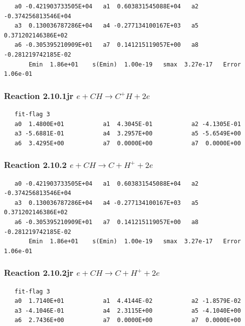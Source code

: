 \documentclass[12pt,dvipdfmx]{article}
\begin{document}
\begin{small}\begin{verbatim}
   a0 -0.421903733505E+04   a1  0.603831545088E+04   a2 -0.374256813546E+04
   a3  0.130036787286E+04   a4 -0.277134100167E+03   a5  0.371202146386E+02
   a6 -0.305395210909E+01   a7  0.141215119057E+00   a8 -0.281219742185E-02
       Emin  1.86e+01    s(Emin)  1.00e-19   smax  3.27e-17   Error  1.06e-01
\end{verbatim}\end{small}

\subsubsection{
Reaction 2.10.1jr   $e + CH \rightarrow C^{+} H + 2e $
}

\begin{small}\begin{verbatim}
   fit-flag 3
   a0  1.4800E+01           a1  4.3045E-01           a2 -4.1305E-01
   a3 -5.6881E-01           a4  3.2957E+00           a5 -5.6549E+00
   a6  3.4295E+00           a7  0.0000E+00           a7  0.0000E+00
\end{verbatim}\end{small}

\subsubsection{
Reaction 2.10.2   $e + CH \rightarrow C + H^+ + 2e $
}

\begin{small}\begin{verbatim}
   a0 -0.421903733505E+04   a1  0.603831545088E+04   a2 -0.374256813546E+04
   a3  0.130036787286E+04   a4 -0.277134100167E+03   a5  0.371202146386E+02
   a6 -0.305395210909E+01   a7  0.141215119057E+00   a8 -0.281219742185E-02
       Emin  1.86e+01    s(Emin)  1.00e-19   smax  3.27e-17   Error  1.06e-01
\end{verbatim}\end{small}


\subsubsection{
Reaction 2.10.2jr  $e + CH \rightarrow C + H^{+} + 2e $
}

\begin{small}\begin{verbatim}
   fit-flag 3
   a0  1.7140E+01           a1  4.4144E-02           a2 -1.8579E-02
   a3 -4.1046E-01           a4  2.3115E+00           a5 -4.1040E+00
   a6  2.7436E+00           a7  0.0000E+00           a7  0.0000E+00
\end{verbatim}\end{small}
\end{document}
